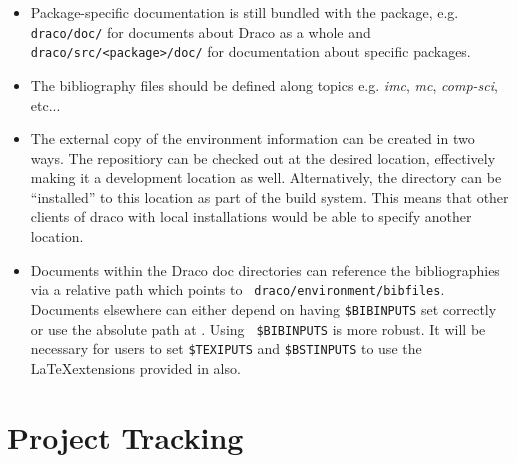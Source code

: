 \documentclass[11pt]{ResearchNote}
\begin{document}
\begin{itemize}
  
\item Package-specific documentation is still bundled with the
  package, e.g. {\tt draco/doc/} for documents about Draco as a
  whole and {\tt draco/src/<package>/doc/} for documentation about
  specific packages.
  
\item The bibliography files should be defined along topics e.g. {\em
    imc}, {\em mc}, {\em comp-sci}, etc...

\item The external copy of the environment information can be created
  in two ways. The repositiory can be checked out at the desired
  location, effectively making it a development location as well.
  Alternatively, the directory can be ``installed'' to this location
  as part of the build system. This means that other clients of draco
  with local installations would be able to specify another location.
  
\item Documents within the Draco doc directories can reference the
  bibliographies via a relative path which points to {\tt
    draco/environment/bibfiles}. Documents elsewhere can either depend
  on having {\tt \$BIBINPUTS} set correctly or use the absolute path
  at . Using {\tt
    \$BIBINPUTS} is more robust. It will be necessary for users to set
  {\tt \$TEXIPUTS} and {\tt \$BSTINPUTS} to use the \LaTeX extensions
  provided in  also.

\end{itemize}
  


\section*{Project Tracking}

%
%   
% 
% 
%
%   
\end{document}
